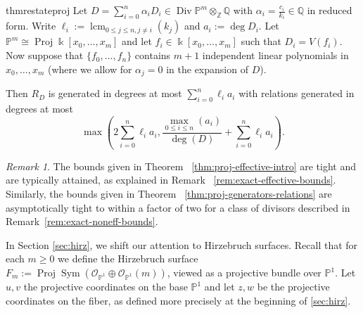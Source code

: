 \documentclass{amsart}
\theoremstyle{plain}
\theoremstyle{definition}
\theoremstyle{remark}
\newtheorem{rem}[thm]{Remark}
\numberwithin{equation}{section}
\newcommand\bq{{\mathbb Q}}
\newcommand\bp{{\mathbb P}}
\newcommand\bz{{\mathbb Z}}
\newcommand\bk{{\Bbbk}}
\newcommand\sco{{\mathscr O}}
\DeclareMathOperator{\sym}{Sym}
\DeclareMathOperator\di{Div}
\newcommand\bida{a}
\DeclareMathOperator{\proj}{Proj}
\DeclareMathOperator{\lcm}{lcm}
\begin{document}
\begin{restatable}{thm}{restateproj}
\label{thm:proj-generators-relations}
Let $D = \sum_{i = 0}^n \alpha_i D_i \in \di \bp^m \otimes_\bz \bq$
with $\alpha_i = \frac{c_i}{k_i}\in \bq$ in reduced form. Write
$\ell_i := \lcm_{0\le j \le n, j \ne i}(k_j)$ and $a_i := \deg D_i$. Let $\bp^m
\cong \proj \bk[x_0, \ldots, x_m]$ and let
$f_i \in \bk[x_0, \ldots, x_m]$ such that $D_i = V(f_i)$. Now
suppose that $\{f_0, \ldots, f_n\}$ contains $m + 1$ independent 
linear polynomials in $x_0, \ldots, x_m$ {\rm(}where we allow for 
$\alpha_j = 0$ in the expansion of $D${\rm)}.

Then $R_D$ is generated in degrees at most 
$\sum_{i = 0}^n \ell_i a_i$
with relations generated in degrees at most
\[
	\max \left(2 \sum_{i=0}^n \ell_i a_i, \frac{\max_{0 \le i \le n}
	(	\bida_i)}{\deg(D)} + \sum_{i=0}^n \ell_i a_i \right).
\]
\end{restatable}

\begin{rem}
\label{rem:proj-tight-bounds}
The bounds
given in Theorem ~\ref{thm:proj-effective-intro}
are tight and are typically attained, as explained in
Remark ~\ref{rem:exact-effective-bounds}.
Similarly, the bounds given in Theorem 
~\ref{thm:proj-generators-relations} are asymptotically
tight to within a factor of two 
for a class of divisors described in
Remark~\ref{rem:exact-noneff-bounds}.
\end{rem}

In Section \ref{sec:hirz}, we shift our attention to Hirzebruch surfaces. Recall that for each $m \geq 0$ we define the
Hirzebruch surface $F_m := \proj \sym (\sco_{\bp^1} \oplus
\sco_{\bp^1}(m))$, viewed as a projective bundle over $\bp^1$.
Let $u,v$ the projective coordinates on the base $\bp^1$ and let $z,w$ be the projective coordinates
on the fiber, as defined more precisely at the beginning of
\ref{sec:hirz}.
\end{document}
